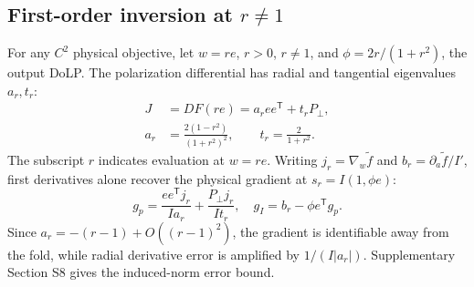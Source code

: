 \subsection{First-order inversion at $r\ne1$}
For any $C^2$ physical objective, let $w=re$, $r>0$, $r\ne1$, and $\phi=2r/(1+r^2)$, the output DoLP. The polarization differential has radial and tangential eigenvalues $a_r,t_r$:
\begin{equation}
 \begin{aligned}
 J&=DF(re)=a_ree^{\mathsf T}+t_rP_\perp,\\
 a_r&=\frac{2(1-r^2)}{(1+r^2)^2},\qquad t_r=\frac2{1+r^2}.
 \end{aligned}
 \label{eq:nearjacobian}
\end{equation}
The subscript $r$ indicates evaluation at $w=re$. Writing $j_r=\nabla_w\widetilde f$ and $b_r=\partial_a\widetilde f/I'$, first derivatives alone recover the physical gradient at $s_r=I(1,\phi e)$:
\begin{equation}
 g_p=\frac{ee^{\mathsf T}j_r}{Ia_r}+\frac{P_\perp j_r}{It_r},\quad
 g_I=b_r-\phi e^{\mathsf T}g_p.
 \label{eq:firstinverse}
\end{equation}
Since $a_r=-(r-1)+O((r-1)^2)$, the gradient is identifiable away from the fold, while radial derivative error is amplified by $1/(I|a_r|)$. Supplementary Section S8 gives the induced-norm error bound.


